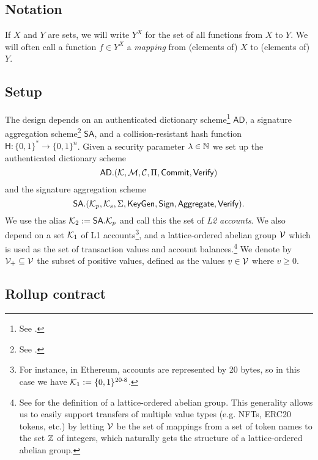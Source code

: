 \subsection{Notation}

If \(X\) and \(Y\) are sets, we will write \(Y^X\) for the set of all functions from \(X\) to \(Y\). We will often call a function \(f \in Y^X\) a \emph{mapping} from (elements of) \(X\) to (elements of) \(Y\).

\subsection{Setup}

The design depends on an authenticated dictionary scheme\footnote{See .} \(\mathsf{AD}\), a signature aggregation scheme\footnote{See .} \(\mathsf{SA}\), and a collision-resistant hash function \(\mathsf{H} : \{0,1\}^* \to \{0,1\}^n\). Given a security parameter \(\lambda \in \mathbb{N}\) we set up the authenticated dictionary scheme \[\mathsf{AD}.(\mathcal{K},\mathcal{M},\mathcal{C},\Pi,\mathsf{Commit},\mathsf{Verify})\] and the signature aggregation scheme \[\mathsf{SA}.(\mathcal{K}_p, \mathcal{K}_s, \Sigma, \mathsf{KeyGen}, \mathsf{Sign}, \mathsf{Aggregate}, \mathsf{Verify}).\] We use the alias \(\mathcal{K}_2 := \mathsf{SA}.\mathcal{K}_p\) and call this the set of \emph{L2 accounts}. We also depend on a set \(\mathcal{K}_1\) of L1 accounts\footnote{For instance, in Ethereum, accounts are represented by 20 bytes, so in this case we have \(\mathcal{K}_1 := \{0,1\}^{20\cdot8}\).}, and a lattice-ordered abelian group \(\mathcal{V}\) which is used as the set of transaction values and account balances.\footnote{See  for the definition of a lattice-ordered abelian group. This generality allows us to easily support transfers of multiple value types (e.g. NFTs, ERC20 tokens, etc.) by letting \(\mathcal{V}\) be the set of mappings from a set of token names to the set \(\mathbb{Z}\) of integers, which naturally gets the structure of a lattice-ordered abelian group.} We denote by \(\mathcal{V}_+ \subseteq \mathcal{V}\) the subset of positive values, defined as the values \(v \in \mathcal{V}\) where \(v \geq 0\).

\subsection{Rollup contract}

